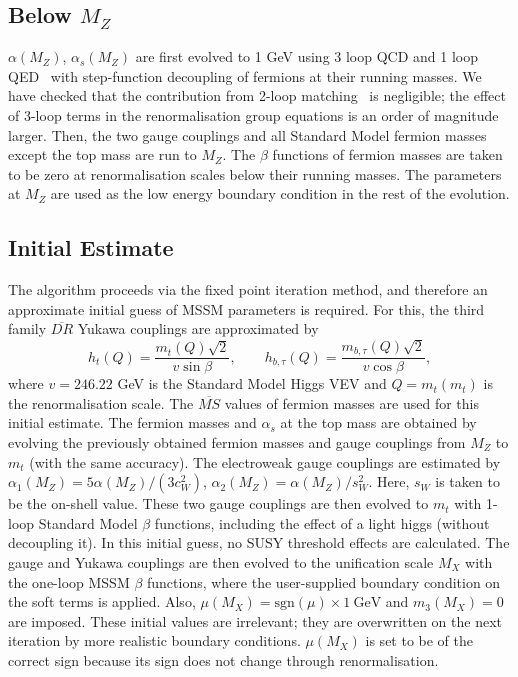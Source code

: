 \documentclass[]{article}
\def\gev{~\mbox{GeV}}
\begin{document}
\subsection{Below $M_Z$}

$\alpha(M_Z)$, $\alpha_s(M_Z)$ are first evolved to 1 GeV using 3 loop QCD and
1 loop QED~\cite{Gorishnii:1990zu,Tarasov:1980au,Gorishnii:1984zi} with
step-function decoupling of fermions at their running masses.
We have checked that the contribution from 2-loop
matching~\cite{Chetyrkin:1997sg} is negligible; the effect of 3-loop terms in
the renormalisation group equations
is an order of magnitude larger.
Then, the two gauge couplings and all Standard Model fermion masses except
the top mass are run to $M_Z$. The $\beta$ functions of fermion masses are
taken to be zero at renormalisation scales below their running masses.
The parameters at $M_Z$ are used as the low energy boundary condition in the
rest of the evolution.

\subsection{Initial Estimate}

The algorithm proceeds via the fixed point iteration method, and therefore an
approximate 
initial guess of MSSM parameters is required. 
For this, the third family $\overline{DR}$ Yukawa couplings are approximated
by 
\begin{equation}
h_t(Q) = \frac{m_t(Q) \sqrt{2}}{v \sin \beta}, \qquad
h_{b,\tau}(Q) = \frac{m_{b,\tau}(Q) \sqrt{2}}{v \cos \beta},
\end{equation}
where $v=246.22$ GeV is the Standard Model Higgs VEV and
$Q=m_t(m_t)$ is the renormalisation scale.
The $\overline{MS}$ values of fermion masses are used for this initial
estimate. 
The fermion masses and $\alpha_s$
at the top mass are obtained by evolving the previously
obtained fermion masses and gauge couplings from $M_Z$ to $m_t$ (with the same
accuracy). 
The electroweak gauge couplings are estimated by $\alpha_1(M_Z)
= 5 \alpha(M_Z) / (3 c_W^2)$, $\alpha_2(M_Z) = \alpha(M_Z) / s_W^2$. Here,
$s_W$ is taken to be the on-shell value. These two gauge couplings are then
evolved 
to $m_t$ with 1-loop Standard Model $\beta$ functions, including the effect of
a light higgs (without decoupling it). In this initial guess, no SUSY
threshold effects are calculated. The gauge and Yukawa couplings are then
evolved to the unification scale $M_X$ with the one-loop MSSM $\beta$
functions, where the user-supplied boundary 
condition on the soft terms is applied. 
Also, $\mu(M_X) =
\mbox{sgn}(\mu)\times1\gev$ and $m_3(M_X)=0$ are imposed. 
These initial values are irrelevant; they are overwritten on the next
iteration by more realistic boundary conditions.
$\mu(M_X)$ is set to be of the correct sign
because its sign does not change through renormalisation. 
\end{document}
